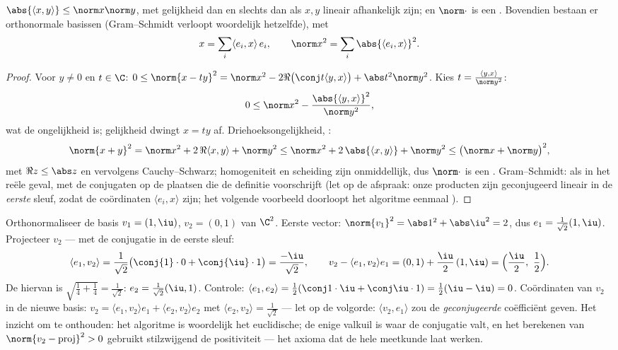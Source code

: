 \begin{theorem}\label{thm:b2:hermitian:cs}
$\abs{\langle x, y\rangle} \leq \norm x \norm y$, met gelijkheid
dan en slechts dan als $x, y$ lineair afhankelijk zijn; en
$\norm\cdot$ is een . Bovendien bestaan er orthonormale
basissen (Gram--Schmidt verloopt woordelijk hetzelfde), met
\[
x = \sum_i \langle e_i, x\rangle\, e_i,
\qquad
\norm x^2 = \sum_i \abs{\langle e_i, x\rangle}^2 .
\]
\end{theorem}

\begin{proof}
Voor $y \neq 0$ en $t \in \C$: $0 \leq \norm{x - ty}^2 = \norm x^2
- 2\Re\bigl(\conj t\langle y, x\rangle\bigr) + \abs t^2\norm y^2$.
Kies $t = \frac{\langle y, x\rangle}{\norm y^2}$:
\[
0 \leq \norm x^2 - \frac{\abs{\langle y, x\rangle}^2}{\norm y^2},
\]
wat de ongelijkheid is; gelijkheid dwingt $x = ty$ af.
Driehoeksongelijkheid, :
\[
\norm{x + y}^2 = \norm x^2 + 2\,\Re\langle x, y\rangle
+ \norm y^2
\leq \norm x^2 + 2\,\abs{\langle x, y\rangle} + \norm y^2
\leq \bigl(\norm x + \norm y\bigr)^2 ,
\]
met $\Re z \leq \abs z$ en vervolgens Cauchy--Schwarz;
homogeniteit en scheiding zijn onmiddellijk, dus $\norm\cdot$ is
een . Gram--Schmidt: als in het reële geval, met de conjugaten
op de plaatsen die de definitie voorschrijft (let op de afspraak:
onze producten zijn geconjugeerd lineair in de \emph{eerste} sleuf,
zodat de coördinaten $\langle e_i, x\rangle$ zijn; het volgende
voorbeeld doorloopt het algoritme eenmaal ).
\end{proof}

\begin{example}\label{ex:b2:hermitian:gramschmidt}
Orthonormaliseer de basis $v_1 = (1, \iu)$, $v_2 = (0, 1)$ van
$\C^2$. Eerste vector: $\norm{v_1}^2 = \abs1^2 + \abs\iu^2 = 2$,
dus $e_1 = \frac{1}{\sqrt2}(1, \iu)$. Projecteer $v_2$ --- met de
conjugatie in de eerste sleuf:
\[
\langle e_1, v_2\rangle
= \frac{1}{\sqrt2}\bigl(\conj{1}\cdot0 +
\conj{\iu}\cdot1\bigr)
= \frac{-\iu}{\sqrt2} ,
\qquad
v_2 - \langle e_1, v_2\rangle e_1
= (0,1) + \frac{\iu}{2}\,(1, \iu)
= \Bigl(\frac\iu2,\ \frac12\Bigr) .
\]
De  hiervan is $\sqrt{\frac14 + \frac14} = \frac{1}{\sqrt2}$:
$e_2 = \frac{1}{\sqrt2}(\iu, 1)$. Controle: $\langle e_1,
e_2\rangle = \frac12(\conj1\cdot\iu + \conj\iu\cdot1) =
\frac12(\iu - \iu) = 0$. Coördinaten van $v_2$ in de nieuwe basis:
$v_2 = \langle e_1, v_2\rangle e_1 + \langle e_2, v_2\rangle e_2$
met $\langle e_2, v_2\rangle = \frac{1}{\sqrt2}$ --- let op de
volgorde: $\langle v_2, e_1\rangle$ zou de \emph{geconjugeerde}
coëfficiënt geven. Het inzicht om te onthouden: het algoritme is
woordelijk het euclidische; de enige valkuil is waar de conjugatie
valt, en het berekenen van $\norm{v_2 - \text{proj}}^2 > 0$
gebruikt stilzwijgend de positiviteit --- het axioma dat de hele
meetkunde laat werken.
\end{example}

